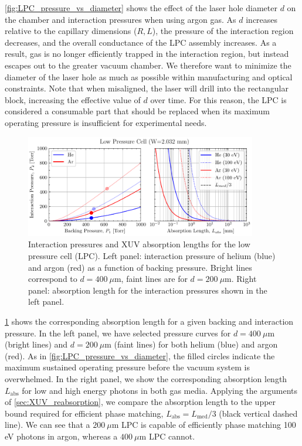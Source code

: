 \cref{fig:LPC_pressure_vs_diameter} shows the effect of the laser hole diameter $d$ on the chamber and interaction pressures when using argon gas. As $d$ increases relative to the capillary dimensions ($R, L$), the pressure of the interaction region decreases, and the overall conductance of the LPC assembly increases. As a result, gas is no longer efficiently trapped in the interaction region, but instead escapes out to the greater vacuum chamber. We therefore want to minimize the diameter of the laser hole as much as possible within manufacturing and optical constraints. Note that when misaligned, the laser will drill into the rectangular block, increasing the effective value of $d$ over time. For this reason, the LPC is considered a consumable part that should be replaced when its maximum operating pressure is insufficient for experimental needs.

\begin{figure}
	\centering
	\includegraphics[width=0.9\textwidth]{figures/chap3/LPC_IntPress_AbsLen.pdf}
	\caption{Interaction pressures and XUV absorption lengths for the low pressure cell (LPC). Left panel: interaction pressure of helium (blue) and argon (red) as a function of backing pressure. Bright lines correspond to $d = 400 \ \mu$m, faint lines are for $d = 200 \ \mu$m. Right panel: absorption length for the interaction pressures shown in the left panel.}
	\label{fig:LPC_IntPress_AbsLen}
\end{figure}

\cref{fig:LPC_IntPress_AbsLen} shows the corresponding absorption length for a given backing and interaction pressure. In the left panel, we have selected pressure curves for $d = 400 \ \mu\textrm{m}$ (bright lines) and $d = 200 \ \mu\textrm{m}$ (faint lines) for both helium (blue) and argon (red). As in \cref{fig:LPC_pressure_vs_diameter}, the filled circles indicate the maximum sustained operating pressure before the vacuum system is overwhelmed. In the right panel, we show the corresponding absorption length $L_{\textrm{abs}}$ for low and high energy photons in both gas media. Applying the arguments of \cref{sec:XUV_reabsorption}, we compare the absorption length to the upper bound required for efficient phase matching, $L_{\textrm{abs}} = L_{\textrm{med}}/3$ (black vertical dashed line). We can see that a $200 \ \mu\textrm{m}$ LPC is capable of efficiently phase matching 100 eV photons in argon, whereas a $400 \ \mu\textrm{m}$ LPC cannot.


